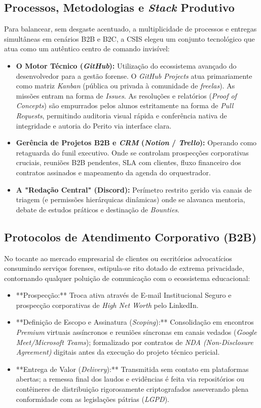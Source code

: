 \documentclass[../main.tex]{subfiles}
\begin{document}
\subsection{Processos, Metodologias e \textit{Stack} Produtivo}
Para balancear, sem desgaste acentuado, a multiplicidade de processos e entregas simultâneas em cenários B2B e B2C, a CSIS elegeu um conjunto tecnológico que atua como um autêntico centro de comando invisível:
\begin{itemize}
    \item \textbf{O Motor Técnico (\textit{GitHub}):} Utilização do ecossistema avançado do desenvolvedor para a gestão forense. O \textit{GitHub Projects} atua primariamente como matriz \textit{Kanban} (pública ou privada à comunidade de \textit{freelas}). As missões entram na forma de \textit{Issues}. As resoluções e relatórios (\textit{Proof of Concepts}) são empurrados pelos alunos estritamente na forma de \textit{Pull Requests}, permitindo auditoria visual rápida e conferência nativa de integridade e autoria do Perito via interface clara.
    \item \textbf{Gerência de Projetos B2B e \textit{CRM} (\textit{Notion} / \textit{Trello}):} Operando como retaguarda do funil executivo. Onde se controlam prospecções corporativas cruciais, reuniões B2B pendentes, SLA com clientes, fluxo financeiro dos contratos assinados e mapeamento da agenda do orquestrador.
    \item \textbf{A "Redação Central" (Discord):} Perímetro restrito gerido via canais de triagem (e permissões hierárquicas dinâmicas) onde se alavanca mentoria, debate de estudos práticos e destinação de \textit{Bounties}.
\end{itemize}

\subsection{Protocolos de Atendimento Corporativo (B2B)}
No tocante ao mercado empresarial de clientes ou escritórios advocatícios consumindo serviços forenses, estipula-se rito dotado de extrema privacidade, contornando qualquer poluição de comunicação com o ecossistema educacional:
\begin{itemize}
    \item **Prospecção:** Troca ativa através de E-mail Institucional Seguro e prospecção corporativas de \textit{High Net Worth} pelo LinkedIn.
    \item **Definição de Escopo e Assinatura (\textit{Scoping}):** Consolidação em encontros \textit{Premium} virtuais assíncronos e reuniões síncronas em canais vedados (\textit{Google Meet/Microsoft Teams}); formalizado por contratos de \textit{NDA (Non-Disclosure Agreement)} digitais antes da execução do projeto técnico pericial.
    \item **Entrega de Valor (\textit{Delivery}):** Transmitida sem contato em plataformas abertas; a remessa final dos laudos e evidências é feita via repositórios ou contêineres de distribuição rigorosamente criptografados asseverando plena conformidade com as legislações pátrias (\textit{LGPD}).
\end{itemize}
\end{document}
